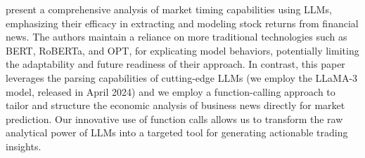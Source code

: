 \mx 

\cite{chen2022expected} present a comprehensive analysis of market timing capabilities using LLMs, emphasizing their efficacy in extracting and modeling stock returns from financial news. The authors maintain a reliance on more traditional technologies such as BERT, RoBERTa, and OPT, for explicating model behaviors, potentially limiting the adaptability and future readiness of their approach.
In contrast, this paper leverages the parsing capabilities of cutting-edge LLMs (we employ the LLaMA-3 model, released in April 2024) and we employ a function-calling approach to tailor and structure the economic analysis of business news directly for market prediction. Our innovative use of function calls allows us to transform the raw analytical power of LLMs into a targeted tool for generating actionable trading insights. 

\mx 

